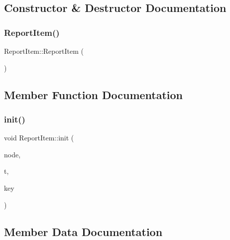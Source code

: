 \subsection{Constructor \& Destructor Documentation}
\mbox{\label{classReportItem_a6d059bb236cd2a0c208014d6e583f10c}} 
\subsubsection{\texorpdfstring{Report\+Item()}{ReportItem()}}
{\footnotesize\ttfamily Report\+Item\+::\+Report\+Item (\begin{DoxyParamCaption}{ }\end{DoxyParamCaption})\hspace{0.3cm}{\ttfamily [inline]}}



\subsection{Member Function Documentation}
\mbox{\label{classReportItem_ac157ccd7df99762daef2974e3ae4ce04}} 
\subsubsection{\texorpdfstring{init()}{init()}}
{\footnotesize\ttfamily void Report\+Item\+::init (\begin{DoxyParamCaption}\item[{void $\ast$}]{node,  }\item[{\hyperlink{reportitem_8h_ae4f179a72db5cca021a37ec4c6fe4c68}{Report\+Type}}]{t,  }\item[{int}]{key }\end{DoxyParamCaption})\hspace{0.3cm}{\ttfamily [inline]}}



\subsection{Member Data Documentation}
\mbox{\label{classReportItem_a0b902ca0b8b8ca4299c9b2d1fdc1b962}} 
